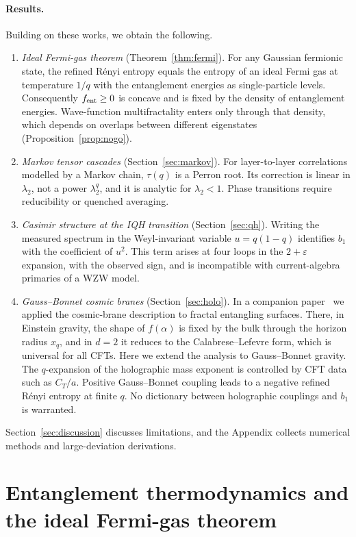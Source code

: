 \documentclass[11pt]{article}
\theoremstyle{definition}\newtheorem{definition}{Definition}[section]
\theoremstyle{remark}\newtheorem*{remark}{Remark}
\begin{document}
\paragraph{Results.} Building on these works, we obtain the following.
\begin{enumerate}
\item \emph{Ideal Fermi-gas theorem} (Theorem~\ref{thm:fermi}). For any Gaussian fermionic state, the refined
R\'enyi entropy equals the entropy of an ideal Fermi gas at temperature $1/q$ with the entanglement energies as
single-particle levels. Consequently $f_{\rm ent}\ge0$ is concave and is fixed by the density of entanglement
energies. Wave-function multifractality enters only through that density, which depends on overlaps between
different eigenstates (Proposition~\ref{prop:nogo}).
\item \emph{Markov tensor cascades} (Section~\ref{sec:markov}). For layer-to-layer correlations modelled by a
Markov chain, $\tau(q)$ is a Perron root. Its correction is linear in $\lambda_2$, not a power $\lambda_2^q$,
and it is analytic for $\lambda_2<1$. Phase transitions require reducibility or quenched averaging.
\item \emph{Casimir structure at the IQH transition} (Section~\ref{sec:qh}). Writing the measured spectrum
in the Weyl-invariant variable $u=q(1-q)$ identifies $b_1$ with the coefficient of $u^2$. This term arises at
four loops in the $2+\varepsilon$ expansion, with the observed sign, and is incompatible with
current-algebra primaries of a WZW model.
\item \emph{Gauss--Bonnet cosmic branes} (Section~\ref{sec:holo}). In a companion paper~\cite{Chen2026_holo} we
applied the cosmic-brane description to fractal entangling surfaces. There, in Einstein gravity, the shape of
$f(\alpha)$ is fixed by the bulk through the horizon radius $x_q$, and in $d=2$ it reduces to the Calabrese--Lefevre
form, which is universal for all CFTs. Here we extend the analysis to Gauss--Bonnet gravity. The $q$-expansion of the
holographic mass exponent is controlled by CFT data such as $C_T/a$. Positive Gauss--Bonnet coupling leads to a negative refined
R\'enyi entropy at finite $q$. No dictionary between holographic couplings and $b_1$ is warranted.
\end{enumerate}
Section~\ref{sec:discussion} discusses limitations, and the Appendix collects numerical methods and
large-deviation derivations.

\section{Entanglement thermodynamics and the ideal Fermi-gas theorem}
\label{sec:fermi}
\end{document}
